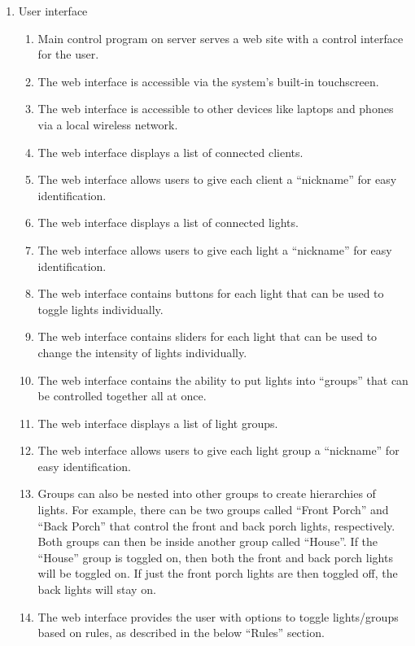 \documentclass[12pt]{article}
\begin{document}
\begin{enumerate}
    \item User interface
        \begin{enumerate}
            \item Main control program on server serves a web site with a
                control interface for the user.
            \item The web interface is accessible via the system's built-in
                touchscreen.
            \item The web interface is accessible to other devices like laptops
                and phones via a local wireless network.
            \item The web interface displays a list of connected clients.
            \item The web interface allows users to give each client a
                ``nickname'' for easy identification.
            \item The web interface displays a list of connected lights.
            \item The web interface allows users to give each light a
                ``nickname'' for easy identification.
            \item The web interface contains buttons for each light that can be
                used to toggle lights individually.
            \item The web interface contains sliders for each light that can be
                used to change the intensity of lights individually.
            \item The web interface contains the ability to put lights into
                ``groups'' that can be controlled together all at once.
            \item The web interface displays a list of light groups.
            \item The web interface allows users to give each light group a
                ``nickname'' for easy identification.
            \item Groups can also be nested into other groups to create
                hierarchies of lights.  For example, there can be two groups
                called ``Front Porch'' and ``Back Porch'' that control the
                front and back porch lights, respectively.  Both groups can
                then be inside another group called ``House''.  If the
                ``House'' group is toggled on, then both the front and back
                porch lights will be toggled on.  If just the front porch
                lights are then toggled off, the back lights will stay on.
            \item The web interface provides the user with options to toggle
                lights/groups based on rules, as described in the below
                ``Rules'' section.
        \end{enumerate}


\end{enumerate}
\end{document}
